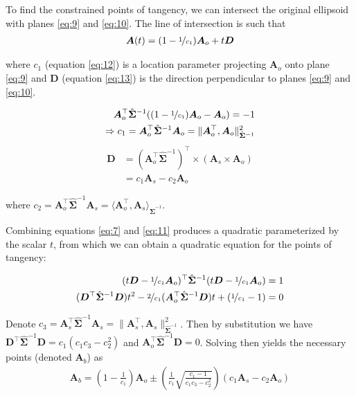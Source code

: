 \documentclass[preprint]{seismica}
\begin{document}
    To find the constrained points of tangency, we can intersect the original ellipsoid with planes
    \ref{eq:9} and \ref{eq:10}. The line of intersection is such that
    \begin{align} \label{eq:11}
      \bm{A}(t) = (1 - \nicefrac{1}{c_1}) \bm{A}_o + t\bm{D}
    \end{align}

    \noindent where $c_1$ (equation \ref{eq:12}) is a location parameter projecting $\bm{A}_o$ onto plane \ref{eq:9}
    and $\bm{D}$ (equation \ref{eq:13}) is the direction perpendicular to planes \ref{eq:9} and \ref{eq:10}. 

    \begin{align} \label{eq:12}
      \nonumber \bm{A}_o^\top \hat{\bm{\Sigma}}^{-1} ((1 - \nicefrac{1}{c_1})\bm{A}_o - \bm{A}_o)  = -1\\
      \Rightarrow c_1 = \bm{A}_o^\top \hat{\bm{\Sigma}}^{-1} \bm{A}_o = \|\bm{A}_o^\top, \bm{A}_o\|_{\hat{\bm{\Sigma}}^{-1}}^2
    \end{align}
    \begin{align} \label{eq:13}
      \nonumber\bm{D} &= (\bm{A}_o^\top \hat{\bm{\Sigma}}^{-1})^\top \times (\bm{A}_s \times \bm{A}_o)\\
        &= c_1\bm{A}_s - c_2\bm{A}_o
    \end{align}

    \noindent where $c_2 = \bm{A}_o^\top \hat{\bm{\Sigma}}^{-1} \bm{A}_s = \langle\bm{A}_o^\top, \bm{A}_s\rangle_{\hat{\bm{\Sigma}}^{-1}}$.

    Combining equations \ref{eq:7} and \ref{eq:11} produces a quadratic parameterized by the scalar $t$,
    from which we can obtain a quadratic equation for the points of tangency:

    \begin{align} \label{eq:14}
      \nonumber (t\bm{D} - \nicefrac{1}{c_1}\bm{A}_o)^\top \hat{\bm{\Sigma}}^{-1} (t\bm{D} - \nicefrac{1}{c_1}\bm{A}_o)  = 1\\
      ({\bm{D}^\top \hat{\bm{\Sigma}}^{-1} \bm{D}})t^2 - 
          \nicefrac{2}{c_1}(\bm{A}_o^\top \hat{\bm{\Sigma}}^{-1} \bm{D})t + (\nicefrac{1}{c_1} - 1) = 0
    \end{align}

    Denote $c_3 = \bm{A}_s^\top \hat{\bm{\Sigma}}^{-1} \bm{A}_s = \|\bm{A}_s^\top, \bm{A}_s\|_{\hat{\bm{\Sigma}}^{-1}}^2$. Then by
    substitution we have
    ${\bm{D}^\top \hat{\bm{\Sigma}}^{-1} \bm{D}} = c_1(c_1c_3 - c_2^2)$ and ${\bm{A}_o^\top \hat{\bm{\Sigma}}^{-1} \bm{D}} = 0$.
    Solving then yields the necessary points (denoted $\bm{A}_b$) as
    \begin{align} \label{eq:15}
      \bm{A}_b = \left(1 - \frac{1}{c_1}\right)\bm{A}_o \pm
        \left(\frac{1}{c_1} \sqrt{\frac{c_1 - 1}{c_1c_3 - c_2^2}}\right)(c_1\bm{A}_s - c_2\bm{A}_o)
    \end{align}
\end{document}
